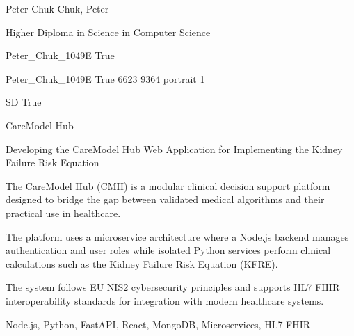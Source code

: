 
\begingroup{}\relax



\def\Key{Peter_Chuk_1049E}

{Peter Chuk}
{Chuk, Peter}

{Higher Diploma in Science in Computer Science}

{Peter_Chuk_1049E}
{True}

{Peter_Chuk_1049E}
{True}
{6623}
{9364}
{portrait}
{1}

{SD}
{True}

{CareModel Hub}

{Developing the CareModel Hub Web Application for Implementing the Kidney Failure Risk Equation}

{The CareModel Hub (CMH) is a modular clinical decision support platform designed to bridge the gap between validated medical algorithms and their practical use in healthcare.

The platform uses a microservice architecture where a Node.js backend manages authentication and user roles while isolated Python services perform clinical calculations such as the Kidney Failure Risk Equation (KFRE).

The system follows EU NIS2 cybersecurity principles and supports HL7 FHIR interoperability standards for integration with modern healthcare systems.}

{Node.js, Python, FastAPI, React, MongoDB, Microservices, HL7 FHIR}

